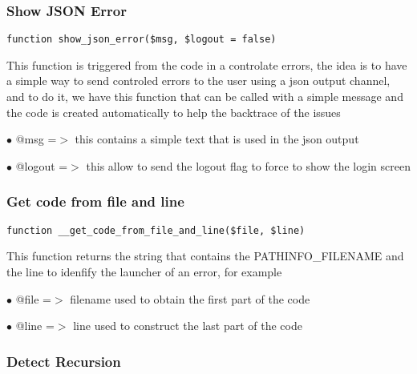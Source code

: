 \documentclass[a4paper]{article}
\begin{document}
\hypertarget{toc118}{}
\subsubsection{Show JSON Error}

\begin{lstlisting}
function show_json_error($msg, $logout = false)
\end{lstlisting}

This function is triggered from the code in a controlate errors, the idea is to have
a simple way to send controled errors to the user using a json output channel, and to
do it, we have this function that can be called with a simple message and the code
is created automatically to help the backtrace of the issues

\begin{compactitem}
\item[\color{myblue}$\bullet$] @msg    =$>$ this contains a simple text that is used in the json output
\item[\color{myblue}$\bullet$] @logout =$>$ this allow to send the logout flag to force to show the login screen
\end{compactitem}

\hypertarget{toc119}{}
\subsubsection{Get code from file and line}

\begin{lstlisting}
function __get_code_from_file_and_line($file, $line)
\end{lstlisting}

This function returns the string that contains the PATHINFO\_FILENAME and the line to idenfify
the launcher of an error, for example

\begin{compactitem}
\item[\color{myblue}$\bullet$] @file =$>$ filename used to obtain the first part of the code
\item[\color{myblue}$\bullet$] @line =$>$ line used to construct the last part of the code
\end{compactitem}

\hypertarget{toc120}{}
\subsubsection{Detect Recursion}
\end{document}
